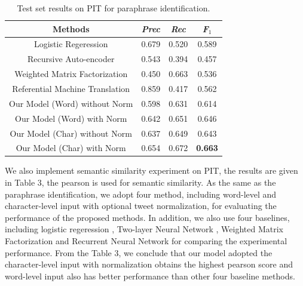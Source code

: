 \documentclass[letterpaper]{article}
\begin{document}
\begin{table}
	\begin{center}
		\begin{tabular}{| c | c | c | c | }
			\hline
			\bf Methods & \bf \textit{Prec} & \bf \textit{Rec}  &\bf  \textit{F}$_{1}$ \\ \hline
			Logistic Regeression  & 0.679 & 0.520 & 0.589  \\ \hline
			Recursive Auto-encoder  & 0.543 & 0.394 & 0.457  \\ 
			\hline
			Weighted Matrix Factorization & 0.450 & 0.663 & 0.536  \\ 
			\hline
			Referential Machine Translation  & 0.859 & 0.417 & 0.562  \\ 
			\hline
			Our Model (Word) without Norm& 0.598 & 0.631 & 0.614  \\ 
			\hline
			Our Model (Word) with Norm & 0.642 & 0.651 & 0.646  \\ 
			\hline
			Our Model (Char) without Norm & 0.637 & 0.649 & 0.643  \\ 
			\hline
			Our Model (Char) with Norm & 0.654 & 0.672 & \bf 0.663  \\ 
			\hline
		\end{tabular}
		\caption{Test set results on PIT for paraphrase identification.}
	\end{center}
\end{table}

We also implement semantic similarity experiment on PIT, the results are given in Table 3, the pearson is used for semantic similarity. As the same as the paraphrase identification, we adopt four method, including word-level and character-level input with optional tweet normalization, for evaluating the performance of the proposed methods. In addition, we also use four baselines, including logistic regeression \cite{das-smith:2009:ACLIJCNLP}, Two-layer Neural Network \cite{bertero-fung:2015:SemEval}, Weighted Matrix Factorization \cite{guo-diab:2012:ACL2012} and Recurrent Neural Network \cite{zarrella-EtAl:2015:SemEval} for comparing the experimental performance. From the Table 3, we conclude that our model adopted the character-level input with normalization obtains the highest pearson score and word-level input also has better performance than other four baseline methods.
\end{document}
